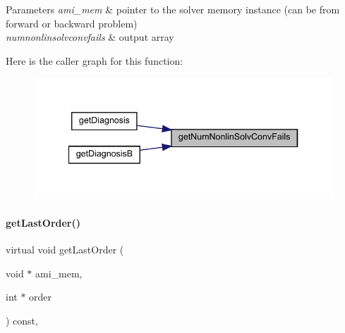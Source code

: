\begin{DoxyParams}{Parameters}
{\em ami\+\_\+mem} & pointer to the solver memory instance (can be from forward or backward problem) \\
\hline
{\em numnonlinsolvconvfails} & output array \\
\hline
\end{DoxyParams}
Here is the caller graph for this function\+:
\nopagebreak
\begin{figure}[H]
\begin{center}
\leavevmode
\includegraphics[width=340pt]{classamici_1_1_solver_a34f79927b47e70db74f77943936e18b0_icgraph}
\end{center}
\end{figure}
\mbox{\label{classamici_1_1_solver_a491a5e0ffd6c1678a8bb5313df88ab45}} 
\paragraph{\texorpdfstring{getLastOrder()}{getLastOrder()}}
{\footnotesize\ttfamily virtual void get\+Last\+Order (\begin{DoxyParamCaption}\item[{void $\ast$}]{ami\+\_\+mem,  }\item[{int $\ast$}]{order }\end{DoxyParamCaption}) const\hspace{0.3cm}{\ttfamily [protected]}, {}}


